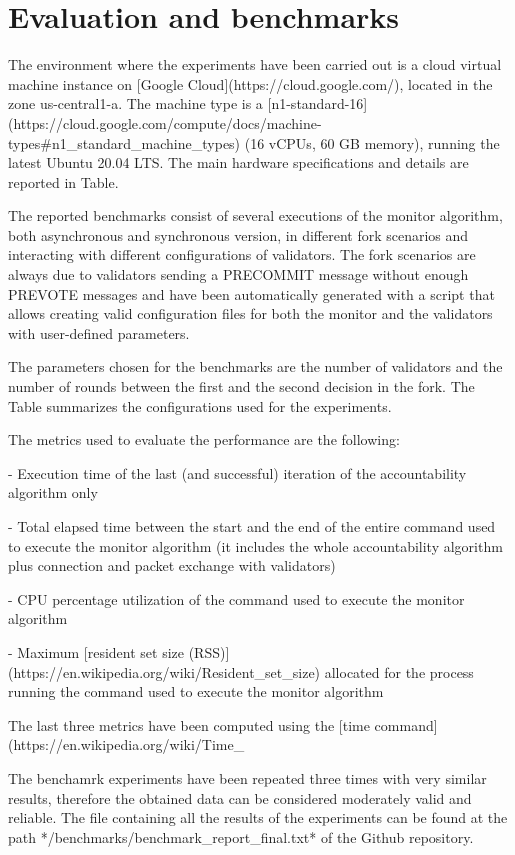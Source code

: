\documentclass[a4paper,11pt,oneside]{report}
\begin{document}
\chapter{Evaluation and benchmarks}

\begin{markdown}

The environment where the experiments have been carried out is a cloud virtual machine instance on [Google Cloud](https://cloud.google.com/), located in the zone us-central1-a. 
The machine type is a [n1-standard-16](https://cloud.google.com/compute/docs/machine-types#n1_standard_machine_types) (16 vCPUs, 60 GB memory), running the latest Ubuntu 20.04 LTS. The main hardware specifications and details are reported in Table.

The reported benchmarks consist of several executions of the monitor algorithm, both asynchronous and synchronous version, in different fork scenarios and interacting with different configurations of validators.
The fork scenarios are always due to validators sending a PRECOMMIT message without enough PREVOTE messages and have been automatically generated with a script that allows creating valid configuration files for both the monitor and the validators with user-defined parameters.

The parameters chosen for the benchmarks are the number of validators and the number of rounds between the first and the second decision in the fork. 
The Table summarizes the configurations used for the experiments.

The metrics used to evaluate the performance are the following:

- Execution time of the last (and successful) iteration of the accountability algorithm only

- Total elapsed time between the start and the end of the entire command used to execute the monitor algorithm (it includes the whole accountability algorithm plus connection and packet exchange with validators)

- CPU percentage utilization of the command used to execute the monitor algorithm

- Maximum [resident set size (RSS)](https://en.wikipedia.org/wiki/Resident_set_size) allocated for the process running the command used to execute the monitor algorithm

The last three metrics have been computed using the [time command](https://en.wikipedia.org/wiki/Time_%

The benchamrk experiments have been repeated three times with very similar results, therefore the obtained data can be considered moderately valid and reliable.
The file containing all the results of the experiments can be found at the path */benchmarks/benchmark_report_final.txt* of the Github repository. 

\end{markdown}
\end{document}

